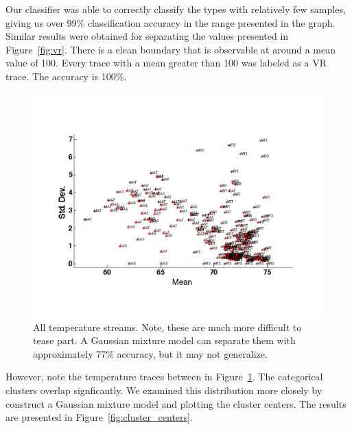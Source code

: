 
Our classifier was able to correctly classify the types with relatively few samples, giving us over 99\% classification accuracy in
the range presented in the graph.  Similar results were obtained for separating the values presented in Figure~\ref{fig:vr}.
There is a clean boundary that is observable at around a mean value of 100.  Every trace with a mean greater than 100 was labeled as a VR
trace.  The accuracy is 100\%.

\begin{figure}[t!] %
\centering
\includegraphics[width=0.8\columnwidth]{figs/temperature_streams}
\caption{All temperature streams.  Note, these are much more difficult to tease part.  A Gaussian mixture model can
separate them with approximately 77\% accuracy, but it may not generalize.}
\label{fig:temps}
\end{figure}

However, note the temperature traces between in Figure~\ref{fig:temps}.  The categorical clusters overlap signficantly.  We 
examined this distribution more closely by construct a Gaussian mixture model and plotting the cluster centers.  The results
are presented in Figure~\ref{fig:cluster_centers}.


